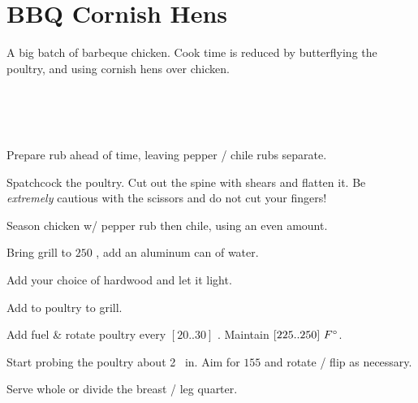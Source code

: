 \section[Cornish Hens]{BBQ Cornish Hens}

\begin{recipestats}[
        servings=$\approx$~24,
        preptime=1~\hour,
        bakingtime=$\approx$3~\hour,
        source=Kevin \& Mike,
    ]
\end{recipestats}

\begin{recipeabstract}
    A big batch of barbeque chicken.
    Cook time is reduced by butterflying the poultry, and using cornish hens
    over chicken.
\end{recipeabstract}

\begin{ingredientcolumns}[1]
    \begin{ingredientblock}
        \\
        \\
        \\
    \end{ingredientblock}
\end{ingredientcolumns}

\begin{preparation}
\item Prepare rub ahead of time, leaving pepper / chile rubs separate.
\item Spatchcock the poultry.
    Cut out the spine with shears and flatten it.
    Be \textit{extremely} cautious with the scissors and do not cut your fingers!
\item Season chicken w/ pepper rub then chile, using an even amount.
\item Bring grill to $250$ \Fahrenheit, add an aluminum can of water.
\item Add your choice of hardwood and let it light.
\item Add to poultry to grill.
\item Add fuel \& rotate poultry every $[20 .. 30]$ \minute.
    Maintain $[225 .. 250]~F^\circ$.
\item Start probing the poultry about 2 \hour~in.
    Aim for $155$ \Fahrenheit and rotate / flip as necessary.
\item Serve whole or divide the breast / leg quarter.
\end{preparation}

\recipeend%
